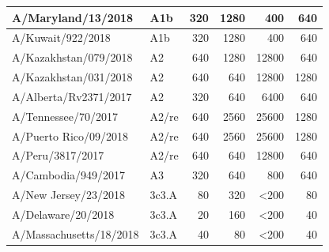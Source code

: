 \begin{table}[htbp]
\begin{tabular}{|p{11em}|p{3em}|r|r|p{5em}|r|}
    \midrule
    A/Maryland/13/2018 & \cellcolor[rgb]{ .678,  .839,  .416}A1b & 320   & 1280  & \multicolumn{1}{r|}{400} & 640 \\
    \midrule
    A/Kuwait/922/2018 & \cellcolor[rgb]{ .678,  .839,  .416}A1b & 320   & 1280  & \multicolumn{1}{r|}{400} & 640 \\
    A/Kazakhstan/079/2018 & \cellcolor[rgb]{ .996,  .733,  .263}A2 & 640   & 1280  & \multicolumn{1}{r|}{12800} & 640 \\
    \midrule
    A/Kazakhstan/031/2018 & \cellcolor[rgb]{ .996,  .733,  .263}A2 & 640   & 640   & \multicolumn{1}{r|}{12800} & 1280 \\
    \midrule
    A/Alberta/Rv2371/2017 & \cellcolor[rgb]{ .996,  .733,  .263}A2 & 320   & 640   & \multicolumn{1}{r|}{6400} & 640 \\
    \midrule
    A/Tennessee/70/2017 & \cellcolor[rgb]{ 1,  .6,  .231}A2/re & 640   & 2560  & \multicolumn{1}{r|}{25600} & 1280 \\
    \midrule
    A/Puerto Rico/09/2018 & \cellcolor[rgb]{ 1,  .6,  .231}A2/re & 640   & 2560  & \multicolumn{1}{r|}{25600} & 1280 \\
    \midrule
    A/Peru/3817/2017 & \cellcolor[rgb]{ 1,  .6,  .231}A2/re & 640   & 640   & \multicolumn{1}{r|}{12800} & 640 \\
    A/Cambodia/949/2017 & \cellcolor[rgb]{ 1,  .412,  .2}A3 & 320   & 640   & \multicolumn{1}{r|}{800} & 640 \\
    A/New Jersey/23/2018 & \cellcolor[rgb]{ .38,  .702,  .788}3c3.A & 80    & 320   & \multicolumn{1}{r|}{\textless200}  & 80 \\
    \midrule
    A/Delaware/20/2018 & \cellcolor[rgb]{ .38,  .702,  .788}3c3.A & 20    & 160   & \multicolumn{1}{r|}{\textless200}  & 40 \\
    \midrule
    A/Massachusetts/18/2018 & \cellcolor[rgb]{ .38,  .702,  .788}3c3.A & 40    & 80    & \multicolumn{1}{r|}{\textless200}  & 40 \\
    \bottomrule
    \end{tabular}%
  \label{sup_tab:titer_table}%
\end{table}%

